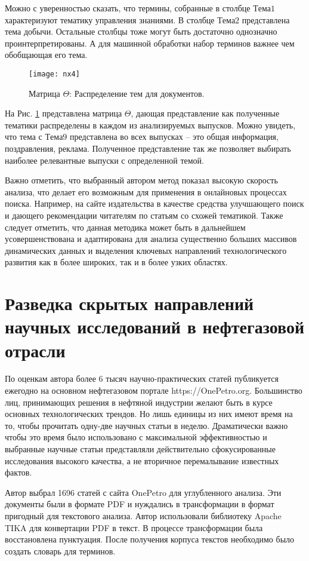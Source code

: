 Можно с уверенностью сказать, что термины, собранные в столбце $Тема1$ характеризуют тематику управления знаниями. 
В столбце $Тема2$ представлена тема добычи. 
Остальные столбцы тоже могут быть достаточно однозначно проинтерпретированы. 
А для машинной обработки набор терминов важнее чем обобщающая его тема.

\begin{figure}[H]
  \caption{Матрица $\Theta$: Распределение тем для документов.}
  \centering
    \texttt{[image: nx4]}
  \label{fig:nx4}
\end{figure} 

На Рис. \ref{fig:nx4} представлена матрица $\Theta$, дающая представление как полученные тематики распределены в каждом из анализируемых выпусков. 
Можно увидеть, что тема с $Тема 9$ представлена во всех выпусках – это общая информация, поздравления, реклама. 
Полученное представление так же позволяет выбирать наиболее релевантные выпуски с определенной темой. 

Важно отметить, что выбранный автором метод показал высокую скорость анализа, что делает его возможным для применения в онлайновых процессах поиска. 
Например, на сайте издательства в качестве средства улучшающего поиск и дающего рекомендации читателям по статьям со схожей тематикой. 
Также следует отметить, что данная методика может быть в дальнейшем усовершенствована и адаптирована для анализа существенно больших массивов динамических данных и выделения ключевых направлений технологического развития как в более широких, так и в более узких областях. 

\section[Скрытые направления исследований]{Разведка скрытых направлений научных исследований в нефтегазовой отрасли}

По оценкам автора более 6 тысяч научно-практических статей публикуется ежегодно на основном нефтегазовом портале https://OnePetro.org. Большинство лиц, принимающих решения в нефтяной индустрии желают быть в курсе основных технологических трендов. Но лишь единицы из них имеют время на то, чтобы прочитать одну-две научных статьи в неделю. Драматически важно чтобы это время было использовано с максимальной эффективностью и выбранные научные статьи представляли действительно сфокусированные исследования высокого качества, а не вторичное перемалывание известных фактов. 

Автор выбрал 1696 статей с сайта OnePetro для углубленного анализа. Эти документы были в формате PDF и нуждались в трансформации в формат пригодный для текстового анализа. Автор использовали библиотеку Apache TIKA для конвертации PDF в текст. В процессе трансформации была восстановлена пунктуация. После получения корпуса текстов необходимо было создать словарь для терминов.

